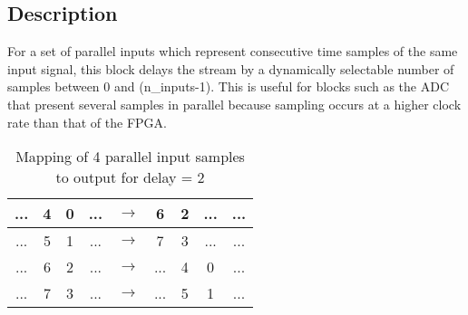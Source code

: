 \documentclass{article}
\newcommand{\BlockDesc}[1]{\subsection*{Description}#1}
\begin{document}
\BlockDesc{For a set of parallel inputs which represent consecutive time samples of the same input signal, this block delays the stream by a dynamically selectable number of samples between 0 and (n\_inputs-1). This is useful for blocks such as the ADC that present several samples in parallel because sampling occurs at a higher clock rate than that of the FPGA.





\begin{table*}[ht]

	\centering

		\begin{tabular}{|c|c|c|c||c||c|c|c|c|}

		\hline

			...	&	4	&	0	&	...	&	$\rightarrow$	&	6	&	2	&	...	&	...	\\ \hline

	 		...	&	5	&	1	&	...	&	$\rightarrow$	&	7	&	3	&	...	&	...	\\ \hline

			...	&	6	&	2	&	...	&	$\rightarrow$	&	...	&	4	&	0	&	...	\\ \hline

			...	&	7	&	3	&	...	&	$\rightarrow$	&	...	&	5	&	1	&	...	\\ \hline

		\end{tabular}	\caption{Mapping of 4 parallel input samples to output for delay = 2}

	\label{tab:MappingOf4ParallelInputSamplesToOutputForDelay2}

\end{table*}



} 
\end{document}
